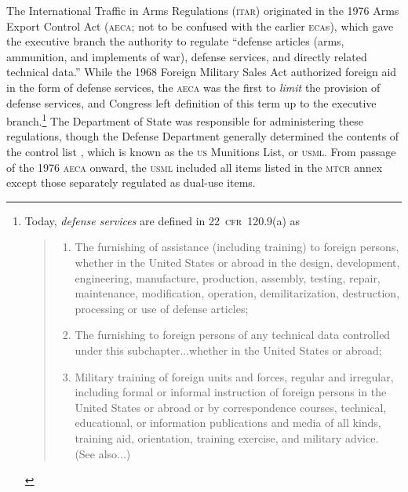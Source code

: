 \documentclass[preprint,twocolumn,5p]{elsarticle}
\begin{document}
The International Traffic in Arms Regulations (\textsc{itar}) originated in the 1976 Arms Export Control Act (\textsc{aeca}; not to be confused with the earlier \textsc{eca}s), which gave the executive branch the authority to regulate ``defense articles (arms, ammunition, and implements of war), defense services, and directly related technical data.'' While the 1968 Foreign Military Sales Act authorized foreign aid in the form of defense services, the \textsc{aeca} was the first to \textit{limit} the provision of defense services, and Congress left definition of this term up to the executive branch.\footnote{Today, \textit{defense services} are defined in 22~\textsc{cfr}~120.9(a) as
\begin{quote}
\begin{enumerate}
\renewcommand\labelenumi{(\theenumi)}
\item The furnishing of assistance (including training) to foreign persons, whether in the United States or abroad in the design, development, engineering, manufacture, production, assembly, testing, repair, maintenance, modification, operation, demilitarization, destruction, processing or use of defense articles;

\item The furnishing to foreign persons of any technical data controlled under this subchapter...whether in the United States or abroad;

\item Military training of foreign units and forces, regular and irregular, including formal or informal instruction of foreign persons in the United States or abroad or by correspondence courses, technical, educational, or information publications and media of all kinds, training aid, orientation, training exercise, and military advice. (See also...)
\end{enumerate}
\end{quote}
}
The Department of State was responsible for administering these regulations, though the Defense Department generally determined the contents of the control list \citep{NAP1987}, which is known as the \textsc{us} Munitions List, or \textsc{usml}. From passage of the 1976 \textsc{aeca} onward, the \textsc{usml} included all items listed in the \textsc{mtcr} annex except those separately regulated as dual-use items.
\end{document}
